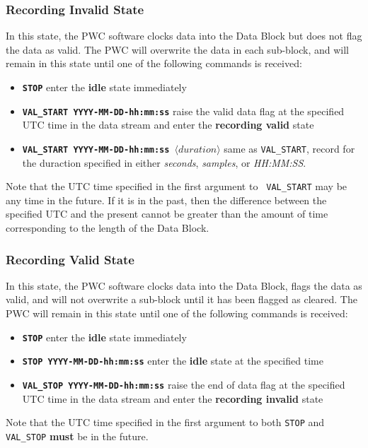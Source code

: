 \subsubsection{Recording Invalid State}

In this state, the PWC software clocks data into the Data Block but
does not flag the data as valid.  The PWC will overwrite the data in
each sub-block, and will remain in this state until one of the
following commands is received:

\begin{itemize}
\item {\tt\bf STOP} enter the {\bf idle} state immediately
\vspace{-2mm}
\item {\tt\bf VAL\_START YYYY-MM-DD-hh:mm:ss} raise the valid data flag
	at the specified UTC time in the data stream and enter the {\bf
	recording valid} state
\vspace{-2mm}
\item {\tt\bf VAL\_START YYYY-MM-DD-hh:mm:ss $\langle duration\rangle$} same 
	as {\tt VAL\_START}, record for the duraction specified in either
	{\it seconds}, {\it samples}, or {\it HH:MM:SS}.
\end{itemize}

Note that the UTC time specified in the first argument to {\tt
VAL\_START} may be any time in the future.  If it is in the past, then
the difference between the specified UTC and the present cannot be
greater than the amount of time corresponding to the length of the
Data Block.

\subsubsection{Recording Valid State}

In this state, the PWC software clocks data into the Data Block, flags
the data as valid, and will not overwrite a sub-block until it has
been flagged as cleared.  The PWC will remain in this state until one
of the following commands is received:

\begin{itemize}
\item {\tt\bf STOP} enter the {\bf idle} state immediately
\vspace{-2mm}
\item {\tt\bf STOP YYYY-MM-DD-hh:mm:ss} enter the {\bf idle} state
	at the specified time
\vspace{-2mm}
\item {\tt\bf VAL\_STOP YYYY-MM-DD-hh:mm:ss} raise the end of data flag
	at the specified UTC time in the data stream and enter the {\bf
	recording invalid} state
\end{itemize}

Note that the UTC time specified in the first argument to both {\tt STOP}
and {\tt VAL\_STOP} {\bf must} be in the future.


